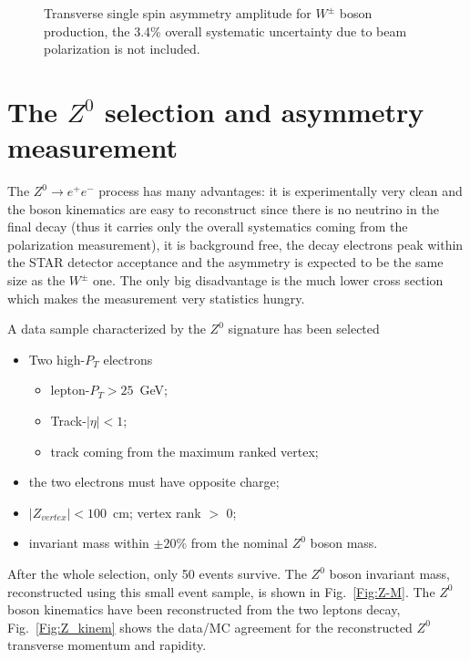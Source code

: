 \documentclass[12pt]{article}
\begin{document}
\begin{figure}[htbp]
  \caption{Transverse single spin asymmetry amplitude for $W^{\pm}$ boson production, the 3.4\% overall systematic uncertainty due to beam polarization is not included.}
  \label{Fig:W-An}
\end{figure}

\section{The $Z^{0}$ selection and asymmetry measurement}
The $Z^{0}\rightarrow e^{+}e^{-}$ process has many advantages: it is experimentally very clean and the boson kinematics are easy to reconstruct since there is no neutrino in the final decay (thus it carries only the overall systematics coming from the polarization measurement), it is background free, the decay electrons peak within the STAR detector acceptance and the asymmetry is expected to be the same size as the $W^{\pm}$ one. The only big disadvantage is the much lower cross section which makes the measurement very statistics hungry. 

A data sample characterized by the $Z^{0}$ signature has been selected 

\begin{itemize}
\item Two high-$P_{T}$ electrons
    \begin{itemize}
    \item lepton-$P_{T}>25$~GeV;
    \item Track-$|\eta|<1$;
    \item track coming from the maximum ranked vertex;
    \end{itemize}
\item the two electrons must have opposite charge;    
\item $|Z_{vertex}| < 100$~cm; vertex rank $>$ 0;    
\item invariant mass within $\pm 20\%$ from the nominal $Z^{0}$ boson mass.
\end{itemize}

After the whole selection, only 50 events survive. The $Z^{0}$ boson invariant mass, reconstructed using this small event sample, is shown in Fig.~\ref{Fig:Z-M}. The $Z^{0}$ boson kinematics have been reconstructed from the two leptons decay, Fig.~\ref{Fig:Z_kinem} shows the data/MC agreement for the reconstructed $Z^{0}$ transverse momentum and rapidity.
\end{document}
